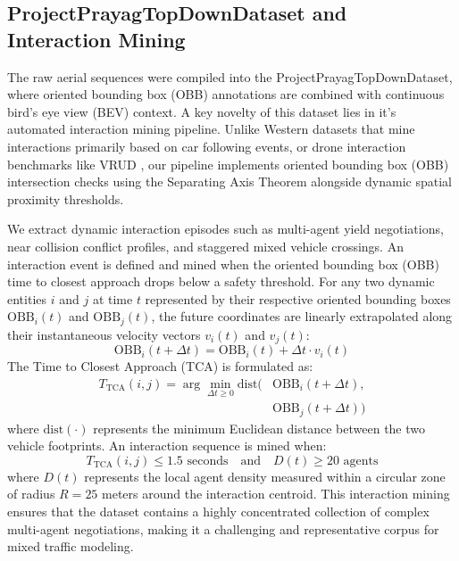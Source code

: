 \documentclass{article}
\begin{document}
\subsection{ProjectPrayagTopDownDataset and Interaction Mining}
The raw aerial sequences were compiled into the ProjectPrayagTopDownDataset, where oriented bounding box (OBB) annotations are combined with continuous bird's eye view (BEV) context. A key novelty of this dataset lies in it's automated interaction mining pipeline. Unlike Western datasets that mine interactions primarily based on car following events, or drone interaction benchmarks like VRUD \cite{b_vrud}, our pipeline implements oriented bounding box (OBB) intersection checks using the Separating Axis Theorem alongside dynamic spatial proximity thresholds. 

We extract dynamic interaction episodes such as multi-agent yield negotiations, near collision conflict profiles, and staggered mixed vehicle crossings. An interaction event is defined and mined when the oriented bounding box (OBB) time to closest approach drops below a safety threshold. For any two dynamic entities $i$ and $j$ at time $t$ represented by their respective oriented bounding boxes $\text{OBB}_i(t)$ and $\text{OBB}_j(t)$, the future coordinates are linearly extrapolated along their instantaneous velocity vectors $v_i(t)$ and $v_j(t)$:
\begin{equation}
\text{OBB}_i(t + \Delta t) = \text{OBB}_i(t) + \Delta t \cdot v_i(t)
\end{equation}
The Time to Closest Approach (TCA) is formulated as:
\begin{equation}
\begin{aligned}
T_{\text{TCA}}(i, j) = \arg\min_{\Delta t \ge 0} \text{dist}\Big( &\text{OBB}_i(t + \Delta t), \\
&\text{OBB}_j(t + \Delta t) \Big)
\end{aligned}
\end{equation}
where $\text{dist}(\cdot)$ represents the minimum Euclidean distance between the two vehicle footprints. An interaction sequence is mined when:
\begin{equation}
T_{\text{TCA}}(i, j) \le 1.5 \text{ seconds} \quad \text{and} \quad D(t) \ge 20 \text{ agents}
\end{equation}
where $D(t)$ represents the local agent density measured within a circular zone of radius $R = 25$ meters around the interaction centroid. This interaction mining ensures that the dataset contains a highly concentrated collection of complex multi-agent negotiations, making it a challenging and representative corpus for mixed traffic modeling.
\end{document}
